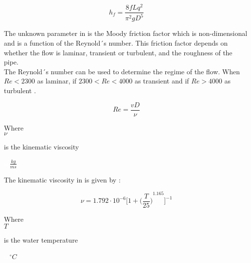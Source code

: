 \begin{equation}
  h_f = \frac{8fLq^2}{\pi^{2}gD^5}
  \label{DarcyWeisbach}
\end{equation} 
 
 The unknown parameter in  is the Moody friction factor 
 which is non-dimensional and is a function of the Reynold´s number. This friction factor depends on whether the flow is laminar, transient or turbulent, and the roughness of the pipe. \\
 
 
The Reynold´s number can be used to determine the regime of the flow. When $Re<2300$ as laminar, if $2300<Re<4000$ as transient and if
$Re>4000$ as turbulent \cite{Intro_Fluid}. 

\begin{equation}
   Re = \frac{vD}{\nu}
   \label{Reynolds}
 \end{equation}
 
  \begin{minipage}[t]{0.20\textwidth}
Where\\
\hspace*{8mm} $\nu$ 
\end{minipage}
\begin{minipage}[t]{0.68\textwidth}
\vspace*{2mm}
is the kinematic viscosity

\end{minipage}
\begin{minipage}[t]{0.10\textwidth}
\vspace*{2mm}
\textcolor{White}{te}$\unit{\frac{kg}{ms}}$
\end{minipage}

The kinematic viscosity in \cite{Design_Water} is given by :

\begin{equation}
  \nu = 1.792 \cdot 10^{-6} \bigg[1+{\bigg(\frac{T}{25}\bigg)}^{1.165} \bigg]^{-1}
\end{equation}

  \begin{minipage}[t]{0.20\textwidth}
Where\\
\hspace*{8mm} $T$ 
\end{minipage}
\begin{minipage}[t]{0.68\textwidth}
\vspace*{2mm}
is the water temperature  
 \end{minipage}
\begin{minipage}[t]{0.10\textwidth}
\vspace*{2mm}
\textcolor{White}{te}$\unit{^{\circ} C}$
\end{minipage}


